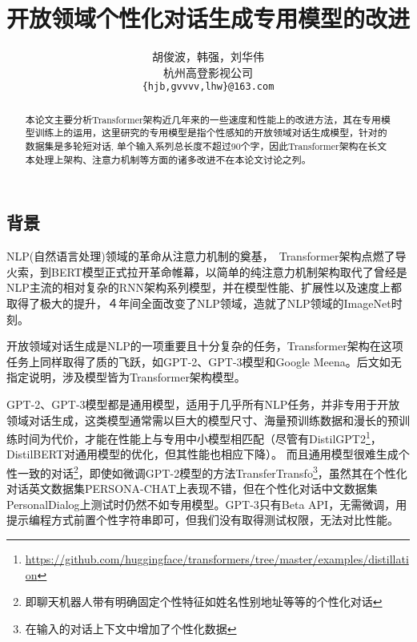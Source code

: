 \documentclass[letterpaper]{article} %
\DeclareRobustCommand{\citeext}[1]{\cite[#1]{#1}}
\begin{document}
\begin{CJK*}{UTF8}{gbsn}

\title{开放领域个性化对话生成专用模型的改进}
\author{胡俊波，韩强，刘华伟 \\
杭州高登影视公司\\
{\tt \{hjb,gvvvv,lhw\}@163.com} \\}

\maketitle
\begin{abstract}
本论文主要分析Transformer架构近几年来的一些速度和性能上的改进方法，其在专用模型训练上的运用，这里研究的专用模型是指个性感知的开放领域对话生成模型，针对的数据集是多轮短对话, 单个输入系列总长度不超过90个字，因此Transformer架构在长文本处理上架构、注意力机制等方面的诸多改进不在本论文讨论之列。
\end{abstract}

\section[Background]{背景} 
NLP(自然语言处理)领域的革命从注意力机制\citeext{Bahdanau2015}的奠基，~Transformer架构\citeext{Vaswani2017}点燃了导火索，到BERT模型\citeext{Devlin2019}正式拉开革命帷幕，以简单的纯注意力机制架构取代了曾经是NLP主流的相对复杂的RNN架构系列模型，并在模型性能、扩展性以及速度上都取得了极大的提升，４年间全面改变了NLP领域，造就了NLP领域的ImageNet时刻\citeext{ruder2018nlpimagenet}。

开放领域对话生成是NLP的一项重要且十分复杂的任务，Transformer架构在这项任务上同样取得了质的飞跃，如GPT-2、GPT-3模型和Google Meena\citeext{Radford2019, Brown2020, Adiwardana2020}。后文如无指定说明，涉及模型皆为Transformer架构模型。

GPT-2、GPT-3模型都是通用模型，适用于几乎所有NLP任务，并非专用于开放领域对话生成，这类模型通常需以巨大的模型尺寸、海量预训练数据和漫长的预训练时间为代价，才能在性能上与专用中小模型相匹配（尽管有DistilGPT2\footnote{\url{https://github.com/huggingface/transformers/tree/master/examples/distillation}}，DistilBERT\citeext{Sanh2019}对通用模型的优化，但其性能也相应下降）。
而且通用模型很难生成个性一致的对话\footnote{即聊天机器人带有明确固定个性特征如姓名性别地址等等的个性化对话}，即使如微调GPT-2模型\citeext{Radford2019}的方法TransferTransfo\citeext{Wolf2019}\footnote{在输入的对话上下文中增加了个性化数据}，虽然其在个性化对话英文数据集PERSONA-CHAT\citeext{Zhang2018}上表现不错，但在个性化对话中文数据集PersonalDialog\citeext{Zheng2019a}上测试时仍然不如专用模型\citeext{Zheng2019}。GPT-3只有Beta API，无需微调，用提示编程方式前置个性字符串即可，但我们没有取得测试权限，无法对比性能。


\end{CJK*}
\end{document}
